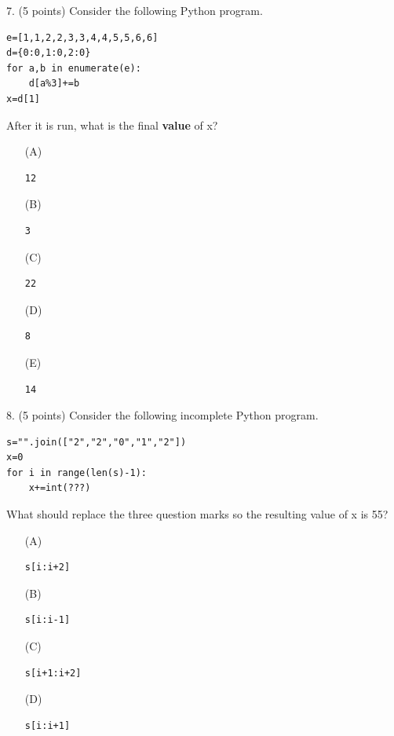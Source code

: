 \documentclass{article}
\newcounter{question}
\begin{document}
\noindent
\begin{minipage}{\textwidth}
7. (5 points)
Consider the following Python program.
\begin{verbatim}
e=[1,1,2,2,3,3,4,4,5,5,6,6]
d={0:0,1:0,2:0}
for a,b in enumerate(e):
    d[a%3]+=b
x=d[1]
\end{verbatim}
After it is run, what is the final \textbf{value} of x?

\begin{enumerate}
\item[(A)]
\begin{verbatim}12\end{verbatim}

\item[(B)]
\begin{verbatim}3\end{verbatim}

\item[(C)]
\begin{verbatim}22\end{verbatim}

\item[(D)]
\begin{verbatim}8\end{verbatim}

\item[(E)]
\begin{verbatim}14\end{verbatim}

\end{enumerate}
\end{minipage}
\vspace{10em}
\filbreak\vfil{}\vfilneg

\noindent
\begin{minipage}{\textwidth}
8. (5 points)
Consider the following incomplete Python program.
\begin{verbatim}
s="".join(["2","2","0","1","2"])
x=0
for i in range(len(s)-1):
    x+=int(???)
\end{verbatim}
What should replace the three question marks so the resulting value of x is 55?

\begin{enumerate}
\item[(A)]
\begin{verbatim}s[i:i+2]\end{verbatim}

\item[(B)]
\begin{verbatim}s[i:i-1]\end{verbatim}

\item[(C)]
\begin{verbatim}s[i+1:i+2]\end{verbatim}

\item[(D)]
\begin{verbatim}s[i:i+1]\end{verbatim}

\end{enumerate}
\end{minipage}
\vspace{10em}
\filbreak\vfil{}\vfilneg
\end{document}
